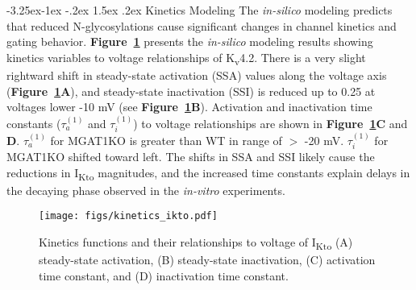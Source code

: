\documentclass[11pt]{article}
\makeatletter
\renewcommand\subsection{\@startsection{subsection}{2}{\z@}%
                                     {-3.25ex\@plus -1ex \@minus -.2ex}%
                                     {1.5ex \@plus .2ex}%
                                     {\normalfont\fontfamily{phv}\fontsize{14}{17}\bfseries}}
\makeatother
\begin{document}
\subsection{Kinetics Modeling} \label{s:results.kinetics}
The \textit{in-silico} modeling predicts that reduced N-glycosylations cause significant changes in channel kinetics and gating behavior. \textbf{Figure~\ref{fig:kinetics_ikto}} presents the \textit{in-silico} modeling results showing kinetics variables to voltage relationships of K\textsubscript{v}4.2. There is a very slight rightward shift in steady-state activation (SSA) values along the voltage axis (\textbf{Figure~\ref{fig:kinetics_ikto}A}), and steady-state inactivation (SSI) is reduced up to 0.25 at voltages lower -10 mV (see \textbf{Figure~\ref{fig:kinetics_ikto}B}). Activation and inactivation time constants ($\tau_{a}^{(1)}$ and $\tau_{i}^{(1)}$) to voltage relationships are shown in \textbf{Figure~\ref{fig:kinetics_ikto}C} and \textbf{D}. $\tau_{a}^{(1)}$ for MGAT1KO is greater than WT in range of $>$ -20 mV. $\tau_{i}^{(1)}$ for MGAT1KO shifted toward left. The shifts in SSA and SSI likely cause the reductions in I\textsubscript{Kto} magnitudes, and the increased time constants explain delays in the decaying phase observed in the \textit{in-vitro} experiments.
\begin{figure}[!ht]
    \centering
    \texttt{[image: figs/kinetics\_ikto.pdf]}
    \caption{Kinetics functions and their relationships to voltage of I\textsubscript{Kto} (A) steady-state activation, (B) steady-state inactivation, (C) activation time constant, and (D) inactivation time constant.}
    \label{fig:kinetics_ikto}
\end{figure}
\end{document}
